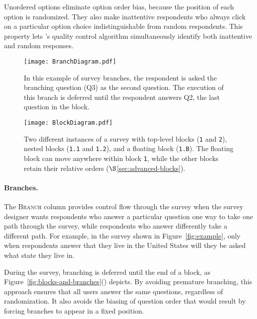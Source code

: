 Unordered options eliminate option order bias, because the
position of each option is randomized. They also make inattentive
respondents who always click on a particular option choice
indistinguishable from random respondents. This property lets
\surveyman{}'s quality control algorithm simultaneously identify both
inattentive and random responses.


\begin{figure*}[!t]
 \centering
 \begin{subfigure}[b]{0.3\textwidth}
                \texttt{[image: BranchDiagram.pdf]}
                \caption{In this example of survey branches, the respondent is asked the branching question (Q3) as the second question. The execution of this branch is deferred until the respondent answers Q2, the last question in the block.}
                \label{fig:branch-diagram}
        \end{subfigure}\quad\quad
 \begin{subfigure}[b]{0.3\textwidth}
                \texttt{[image: BlockDiagram.pdf]}
                \caption{Two different instances of a survey with top-level blocks (\texttt{1} and \texttt{2}), nested blocks (\texttt{1.1} and \texttt{1.2}), and a floating block (\texttt{1.B}). The floating block can move anywhere within block \texttt{1}, while the other blocks retain their relative orders ($\S$\ref{sec:advanced-blocks}).}
                \label{fig:block-diagram}
        \end{subfigure}\caption{Examples of branches and blocks.\label{fig:blocks-and-branches}}
\end{figure*}

\paragraph{Branches.}
The \textsc{Branch} column provides control flow through the survey
when the survey designer wants respondents who answer a particular
question one way to take one path through the survey, while
respondents who answer differently take a different path. 
For example, in the survey shown in Figure~\ref{fig:example}, only
when respondents answer that they live in the United States will they
be asked what state they live in.

During the survey, branching is deferred until the end of a block, as
Figure~\ref{fig:blocks-and-branches}() depicts. By avoiding premature branching, this
approach ensures that all users answer the same questions, regardless
of randomization. It also avoids the biasing of question order that
would result by forcing branches to appear in a fixed position.

